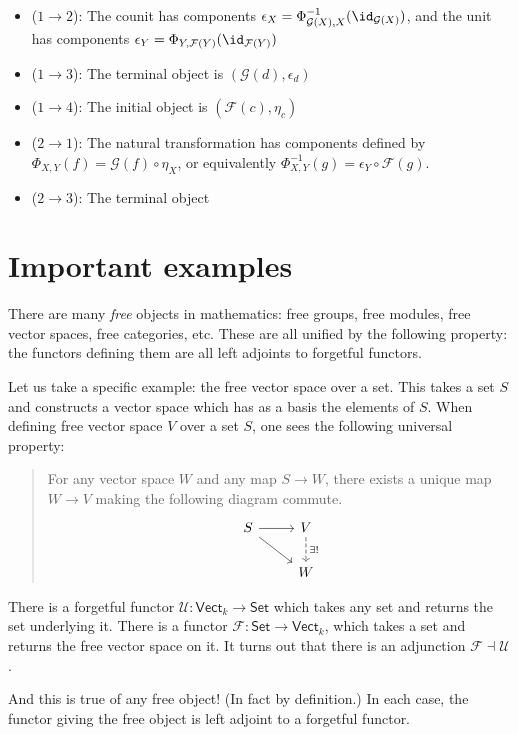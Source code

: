 \documentclass[notes.tex]{subfiles}
\begin{document}
\begin{itemize}
  \item ($1 \to 2$): The counit has components $\epsilon_{X} = \Phi^{-1}_{\mathcal{G}(X),X}(\id_{\mathcal{G}(X)})$, and the unit has components $\epsilon_{Y} = \Phi_{Y,\mathcal{F}(Y)}(\id_{\mathcal{F}(Y)})$

  \item ($1 \to 3$): The terminal object is $(\mathcal{G}(d), \epsilon_{d})$

  \item ($1 \to 4$): The initial object is $(\mathcal{F}(c), \eta_{c})$

  \item ($2 \to 1$): The natural transformation has components defined by $\Phi_{X,Y}(f) = \mathcal{G}(f) \circ \eta_{X}$, or equivalently $\Phi_{X,Y}^{-1}(g) = \epsilon_{Y} \circ \mathcal{F}(g)$.

  \item ($2 \to 3$): The terminal object
\end{itemize}

\section{Important examples}
\label{sec:important_examples}

\begin{example}
  \label{eg:freeforgetfuladjunctions}
  There are many \emph{free} objects in mathematics: free groups, free modules, free vector spaces, free categories, etc. These are all unified by the following property: the functors defining them are all left adjoints to forgetful functors.

  Let us take a specific example: the free vector space over a set. This takes a set $S$ and constructs a vector space which has as a basis the elements of $S$. When defining free vector space $V$ over a set $S$, one sees the following universal property:
  \begin{quote}
    For any vector space $W$ and any map $S \to W$, there exists a unique map $W \to V$ making the following diagram commute.
    \begin{equation*}
      \begin{tikzcd}
        S
        \arrow[r]
        \arrow[dr]
        & V
        \arrow[d, dashed, "\exists!"]
        \\
        & W
      \end{tikzcd}
    \end{equation*}
  \end{quote}

  There is a forgetful functor $\mathcal{U}\colon \mathsf{Vect}_{k} \rightarrow \mathsf{Set}$ which takes any set and returns the set underlying it. There is a functor $\mathcal{F}\colon \mathsf{Set} \rightarrow \mathsf{Vect}_{k}$, which takes a set and returns the free vector space on it. It turns out that there is an adjunction $\mathcal{F} \dashv \mathcal{U}$.

  And this is true of any free object! (In fact by definition.) In each case, the functor giving the free object is left adjoint to a forgetful functor.
\end{example}
\end{document}
